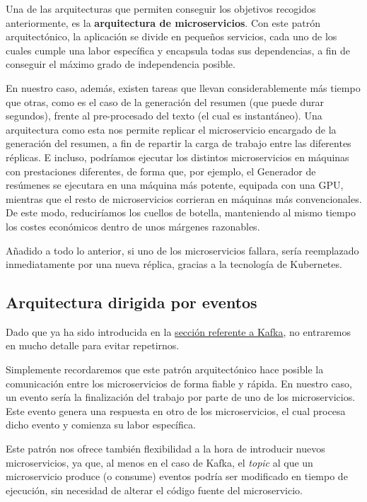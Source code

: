 Una de las arquitecturas que permiten conseguir los objetivos recogidos anteriormente, es la \textbf{arquitectura de microservicios}. Con este patrón arquitectónico, la aplicación se divide en pequeños servicios, cada uno de los cuales cumple una labor específica y encapsula todas sus dependencias, a fin de conseguir el máximo grado de independencia posible.

En nuestro caso, además, existen tareas que llevan considerablemente más tiempo que otras, como es el caso de la generación del resumen (que puede durar segundos), frente al pre-procesado del texto (el cual es instantáneo). Una arquitectura como esta nos permite replicar el microservicio encargado de la generación del resumen, a fin de repartir la carga de trabajo entre las diferentes réplicas. E incluso, podríamos ejecutar los distintos microservicios en máquinas con prestaciones diferentes, de forma que, por ejemplo, el Generador de resúmenes se ejecutara en una máquina más potente, equipada con una GPU, mientras que el resto de microservicios corrieran en máquinas más convencionales. De este modo, reduciríamos los cuellos de botella, manteniendo al mismo tiempo los costes económicos dentro de unos márgenes razonables.

Añadido a todo lo anterior, si uno de los microservicios fallara, sería reemplazado inmediatamente por una nueva réplica, gracias a la tecnología de Kubernetes.

\subsection{Arquitectura dirigida por eventos}

Dado que ya ha sido introducida en la \hyperref[subsec:kafka]{sección referente a Kafka}, no entraremos en mucho detalle para evitar repetirnos.

Simplemente recordaremos que este patrón arquitectónico hace posible la comunicación entre los microservicios de forma fiable y rápida. En nuestro caso, un evento sería la finalización del trabajo por parte de uno de los microservicios. Este evento genera una respuesta en otro de los microservicios, el cual procesa dicho evento y comienza su labor específica.

Este patrón nos ofrece también flexibilidad a la hora de introducir nuevos microservicios, ya que, al menos en el caso de Kafka, el \emph{topic} al que un microservicio produce (o consume) eventos podría ser modificado en tiempo de ejecución, sin necesidad de alterar el código fuente del microservicio.

